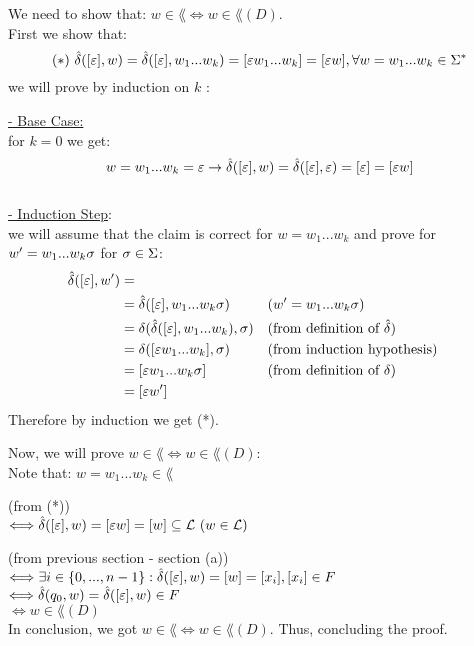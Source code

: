 We need to show that: $w \in \lang \Longleftrightarrow  w \in \lang(D)$. \\
First we show that:
\[
    (*) \text{   } \hat{\delta}([\varepsilon], w) = \hat{\delta}([\varepsilon], w_1...w_k) = [\varepsilon w_1...w_k] = [\varepsilon w], \forall w =w_1...w_k \in \Sigma^*\\
\]
we will prove by induction on $k$ :

\underline{- Base Case:} \\
for $k=0$ we get: \\
\[
    w = w_1...w_k = \varepsilon \rightarrow \hat{\delta}([\varepsilon], w) =  \hat{\delta}([\varepsilon], \varepsilon) = [\varepsilon] = [\varepsilon w]
\] \\

\underline{- Induction Step}: \\
we will assume that the claim is correct for $w=w_1...w_k$ and prove for $w'=w_1...w_k \sigma$ for $\sigma \in \Sigma$:
\[
    \begin{aligned}
        \hat{\delta}([\varepsilon], w') & =                                                                                    \\
                               & = \hat{\delta}([\varepsilon], w_1...w_k\sigma)        &  & (w'=w_1...w_k \sigma)                    \\
                               & = \delta(\hat{\delta}([\varepsilon], w_1...w_k), \sigma) &  & (\text{from definition of }\hat{\delta}) \\
                               & = \delta([\varepsilon w_1...w_k], \sigma)             &  & (\text{from induction hypothesis})    \\
                               & = [\varepsilon w_1...w_k \sigma]                   &  & (\text{from definition of }\delta)       \\
                               & = [\varepsilon w']
    \end{aligned}
\]
Therefore by induction we get (*).

Now, we will prove $w \in \lang \Longleftrightarrow  w \in \lang(D)$: \\
Note that:
$ w = w_1...w_k \in \lang $

(from (*)) \\
$ \Longleftrightarrow \hat{\delta}([\varepsilon], w) = [\varepsilon w] = [w] \subseteq \mathcal{L} \text{ } (w \in \mathcal{L})$

(from previous section - section (a)) \\
$ \Longleftrightarrow \exists i \in \{0,...,n-1\}: \hat{\delta}([\varepsilon], w) = [w] = [x_i], [x_i] \in F $ \\

$ \Longleftrightarrow \hat{\delta}(q_0, w) = \hat{\delta}([\varepsilon], w) \in F $ \\

$ \Longleftrightarrow  w \in \lang(D) $ \\
In conclusion, we got $w \in \lang \Longleftrightarrow  w \in \lang(D)$. Thus, concluding the proof. \\

